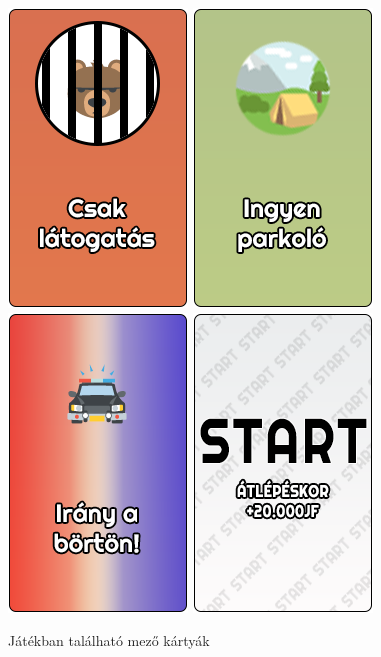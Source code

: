 \begin{figure}[h!]
\includegraphics[scale=0.4]{images/bori_latogatas.png}
\includegraphics[scale=0.4]{images/parkolo.png}
\includegraphics[scale=0.4]{images/bori.png}
\includegraphics[scale=0.4]{images/start.png}
\caption{Játékban található mező kártyák}
\label{fig:ff}
\end{figure}

